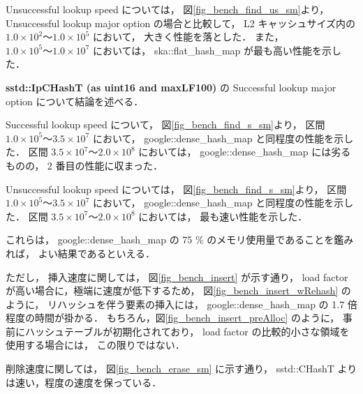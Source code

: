Unsuccessful lookup speed については，
図\ref{fig_bench_find_us_sm}より，
Unsuccessful lookup major option の場合と比較して，
L2 キャッシュサイズ内の $1.0\times10^2〜1.0\times10^5$ において，
大きく性能を落とした．
また，$1.0\times10^5〜1.0\times10^7$ においては，
ska::flat\_hash\_map が最も高い性能を示した．
\newline

{\bf sstd::IpCHashT (as uint16 and maxLF100)} の Successful lookup major option について結論を述べる．

Successful lookup speed について，
図\ref{fig_bench_find_s_sm}より，
区間 $1.0\times10^5〜3.5\times10^7$ において，
google::dense\_hash\_map と同程度の性能を示した．
区間 $3.5\times10^7〜2.0\times10^8$ においては，
google::dense\_hash\_map には劣るものの，
2 番目の性能に収まった．

Unsuccessful lookup speed については，
図\ref{fig_bench_find_s_sm}より，
区間 $1.0\times10^5〜3.5\times10^7$ において，
google::dense\_hash\_map と同程度の性能を示した．
区間 $3.5\times10^7〜2.0\times10^8$ においては，
最も速い性能を示した．

これらは，
google::dense\_hash\_map の 75 \% のメモリ使用量であることを鑑みれば，
よい結果であるといえる．

ただし，
挿入速度に関しては，
図\ref{fig_bench_insert} が示す通り，
load factor が高い場合に，極端に速度が低下するため，
図\ref{fig_bench_insert_wRehash} のように，
リハッシュを伴う要素の挿入には，
google::dense\_hash\_map の 1.7 倍程度の時間が掛かる．
もちろん，図\ref{fig_bench_insert_preAlloc} のように，
事前にハッシュテーブルが初期化されており，
load factor の比較的小さな領域を使用する場合には，
この限りではない．

削除速度に関しては，
図\ref{fig_bench_erase_sm} に示す通り，
sstd::CHashT よりは速い，程度の速度を保っている．
\newline

